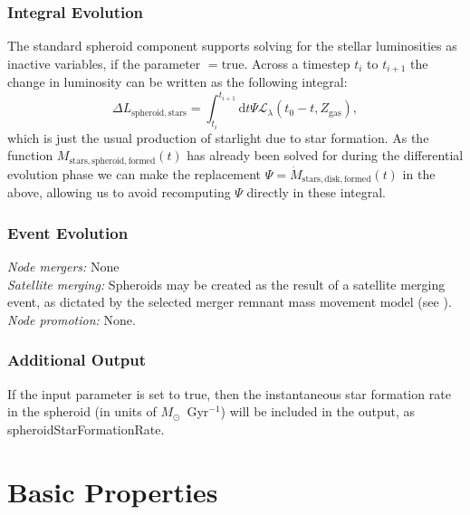 \subsubsection{Integral Evolution}

The standard spheroid component supports solving for the stellar luminosities as inactive variables, if the parameter {\normalfont \ttfamily [spheroidLuminositiesStellarInactive]}$=${\normalfont \ttfamily true}. Across a timestep $t_i$ to $t_{i+1}$ the change in luminosity can be written as the following integral:
\begin{equation}
\Delta L_\mathrm{spheroid, stars} = \int_{t_{i}}^{t_{i+1}} \mathrm{d}t \Psi \mathcal{L}_\lambda(t_0-t,Z_\mathrm{gas}),
\end{equation}
which is just the usual production of starlight due to star formation. As the function $M_\mathrm{stars, spheroid, formed}(t)$ has already been solved for during the differential evolution phase we can make the replacement $\Psi = \dot{M}_\mathrm{stars, disk, formed}(t)$ in the above, allowing us to avoid recomputing $\Psi$ directly in these integral.

\subsubsection{Event Evolution}

\noindent\emph{Node mergers:} None\\

\noindent\emph{Satellite merging:} Spheroids may be created as the result of a satellite merging event, as dictated by the selected merger remnant mass movement model (see ).\\

\noindent\emph{Node promotion:} None.\\

\subsubsection{Additional Output}

If the {\normalfont \ttfamily [spheroidOutputStarFormationRate]} input parameter is set to true, then the instantaneous star formation rate in the spheroid (in units of $M_\odot$~Gyr$^{-1}$) will be included in the output, as {\normalfont \ttfamily spheroidStarFormationRate}.

\section{Basic Properties}\label{sec:ComponentBasicProperties}


